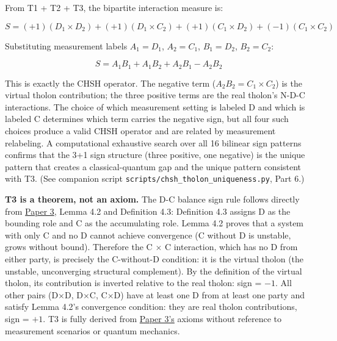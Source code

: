 \documentclass[
  11pt,
  letterpaper,
]{article}
\begin{document}
From T1 + T2 + T3, the bipartite interaction measure is:

\[S = (+1)(D_1 \times D_2) + (+1)(D_1 \times C_2) + (+1)(C_1 \times D_2) + (-1)(C_1 \times C_2)\]

Substituting measurement labels \(A_1 = D_1\), \(A_2 = C_1\),
\(B_1 = D_2\), \(B_2 = C_2\):

\[S = A_1B_1 + A_1B_2 + A_2B_1 - A_2B_2\]

This is exactly the CHSH operator. The negative term
(\(A_2B_2 = C_1 \times C_2\)) is the virtual tholon contribution; the
three positive terms are the real tholon's N-D-C interactions. The
choice of which measurement setting is labeled D and which is labeled C
determines which term carries the negative sign, but all four such
choices produce a valid CHSH operator and are related by measurement
relabeling. A computational exhaustive search over all 16 bilinear sign
patterns confirms that the 3+1 sign structure (three positive, one
negative) is the unique pattern that creates a classical-quantum gap and
the unique pattern consistent with T3. (See companion script
\texttt{scripts/chsh\_tholon\_uniqueness.py}, Part 6.)

\textbf{T3 is a theorem, not an axiom.} The D-C balance sign rule
follows directly from
\href{https://github.com/baardev/truevalue/blob/main/docnav/Research/papers/3_minimal-recursive-triadic-framework/3_minimal-recursive-triadic-framework.pdf}{Paper
3}, Lemma 4.2 and Definition 4.3: Definition 4.3 assigns D as the
bounding role and C as the accumulating role. Lemma 4.2 proves that a
system with only C and no D cannot achieve convergence (C without D is
unstable, grows without bound). Therefore the C \(\times\) C
interaction, which has no D from either party, is precisely the
C-without-D condition: it is the virtual tholon (the unstable,
unconverging structural complement). By the definition of the virtual
tholon, its contribution is inverted relative to the real tholon: sign =
\(-1\). All other pairs (D\(\times\)D, D\(\times\)C, C\(\times\)D) have
at least one D from at least one party and satisfy Lemma 4.2's
convergence condition: they are real tholon contributions, sign =
\(+1\). T3 is fully derived from
\href{https://github.com/baardev/truevalue/blob/main/docnav/Research/papers/3_minimal-recursive-triadic-framework/3_minimal-recursive-triadic-framework.pdf}{Paper
3's} axioms without reference to measurement scenarios or quantum
mechanics.
\end{document}
